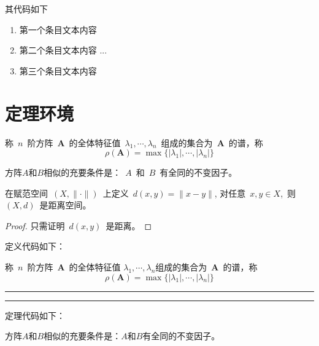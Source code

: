 其代码如下

\begin{VerbWithBreak}
\begin{enumerate}
  \item 第一个条目文本内容
  \item 第二个条目文本内容
  ...
  \item 第三个条目文本内容
\end{enumerate}
\end{VerbWithBreak}



\section{定理环境}

\begin{definition}[谱半径]\label{def:def1}
  称~$n$~阶方阵~$\mathbf{A}$~的全体特征值~$\lambda_1,\cdots,\lambda_n$~组成的集合为~$\mathbf{A}$~的谱，称
  $$\rho(\mathbf{A})=\max{\{|\lambda_1|,\cdots,|\lambda_n|\}}$$
\end{definition}
\begin{theorem}[相似充要条件]\label{lemma:l1}
  方阵$A$和$B$相似的充要条件是：~$A$~和~$B$~有全同的不变因子。
\end{theorem}
\begin{corollary}[推论1]\label{cor:cor1}
在赋范空间~$(X,\|\cdot\|)$~上定义~$d(x,y)=\|x-y\|$, 对任意~$x,y\in X$,~则~$(X,d)$~是距离空间。
\end{corollary}
\begin{proof}
  只需证明~$d(x,y)$~是距离。
\end{proof}
\newpage

定义代码如下：
\begin{VerbWithBreak}
 \begin{definition}[谱半径]\label{def:def1}
  称~$n$~阶方阵~$\mathbf{A}$~的全体特征值
  $\lambda_1,\cdots,\lambda_n$组成的集合为~$\mathbf{A}$~的谱，称
  $$\rho(\mathbf{A})=\max{\{|\lambda_1|,\cdots,|\lambda_n|\}}$$
\end{definition}
\end{VerbWithBreak}
\noindent\hrule

\vspace{0.1em}\noindent\hrule
\vspace{1em}
定理代码如下：
\begin{VerbWithBreak}
\begin{theorem}[相似充要条件]\label{lemma:l1}
  方阵$A$和$B$相似的充要条件是：$A$和$B$有全同的不变因子。
\end{theorem}
\end{VerbWithBreak}

